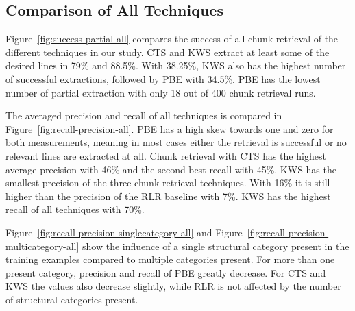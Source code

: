 \documentclass[\myrootdir/main.tex]{subfiles}
\begin{document}
\subsection{Comparison of All Techniques}
Figure~\ref{fig:success-partial-all} compares the success of all chunk retrieval of the different techniques in our study.
CTS and KWS extract at least some of the desired lines in 79\% and 88.5\%.
With 38.25\%, KWS also has the highest number of successful extractions, followed by PBE with 34.5\%.
PBE has the lowest number of partial extraction with only 18 out of 400 chunk retrieval runs.

The averaged precision and recall of all techniques is compared in Figure~\ref{fig:recall-precision-all}.
PBE has a high skew towards one and zero for both measurements, meaning in most cases either the retrieval is successful or no relevant lines are extracted at all.
Chunk retrieval with CTS has the highest average precision with 46\% and the second best recall with 45\%.
KWS has the smallest precision of the three chunk retrieval techniques.
With 16\% it is still higher than the precision of the RLR baseline with 7\%.
KWS has the highest recall of all techniques with 70\%.

Figure~\ref{fig:recall-precision-singlecategory-all} and Figure~\ref{fig:recall-precision-multicategory-all} show the influence of a single structural category present in the training examples compared to multiple categories present.
For more than one present category, precision and recall of PBE greatly decrease.
For CTS and KWS the values also decrease slightly, while RLR is not affected by the number of structural categories present.
\end{document}
